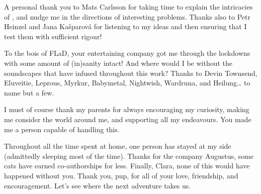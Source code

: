 A personal thank you to Mats Carlsson for taking time to explain the intricacies of \Radyn{}, and nudge me in the directions of interesting problems.
Thanks also to Petr Heinzel and Jana Kašparová for listening to my ideas and then ensuring that I test them with sufficient rigour!

To the bois of FLaD, your entertaining company got me through the lockdowns with some amount of (in)sanity intact!
And where would I be without the soundscapes that have infused throughout this work?
Thanks to Devin Townsend, Eluveitie, Leprous, Myrkur, Babymetal, Nightwish, Wardruna, and Heilung\dots{} to name but a few.

I must of course thank my parents for always encouraging my curiosity, making me consider the world around me, and supporting all my endeavours.
You made me a person capable of handling this.

Throughout all the time spent at home, one person has stayed at my side (admittedly sleeping most of the time).
Thanks for the company Augustus, some cats have earned co-authorships for less.
Finally, Clara, none of this would have happened without you.
Thank you, pup, for all of your love, friendship, and encouragement.
Let's see where the next adventure takes us.